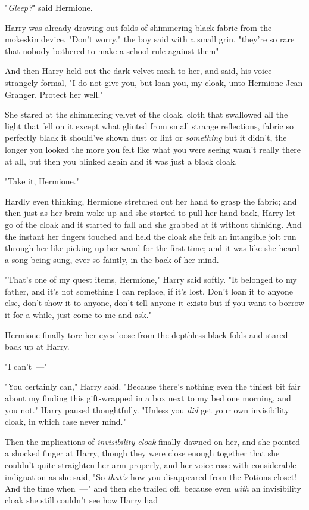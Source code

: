 "\emph{Gleep?}" said Hermione.

Harry was already drawing out folds of shimmering black fabric from the
mokeskin device. "Don't worry," the boy said with a small grin, "they're so
rare that nobody bothered to make a school rule against them{\el}"

And then Harry held out the dark velvet mesh to her, and said, his voice
strangely formal, "I do not give you, but loan you, my cloak, unto Hermione
Jean Granger. Protect her well."

She stared at the shimmering velvet of the cloak, cloth that swallowed all the
light that fell on it except what glinted from small strange reflections,
fabric so perfectly black it should've shown dust or lint or \emph{something}
but it didn't, the longer you looked the more you felt like what you were
seeing wasn't really there at all, but then you blinked again and it was just a
black cloak.

"Take it, Hermione."

Hardly even thinking, Hermione stretched out her hand to grasp the fabric; and
then just as her brain woke up and she started to pull her hand back, Harry let
go of the cloak and it started to fall and she grabbed at it without thinking.
And the instant her fingers touched and held the cloak she felt an intangible
jolt run through her like picking up her wand for the first time; and it was
like she heard a song being sung, ever so faintly, in the back of her mind.

"That's one of my quest items, Hermione," Harry said softly. "It belonged to my
father, and it's not something I can replace, if it's lost. Don't loan it to
anyone else, don't show it to anyone, don't tell anyone it exists{\el} but
if you want to borrow it for a while, just come to me and ask."

Hermione finally tore her eyes loose from the depthless black folds and stared
back up at Harry.

"I can't~---"

"You certainly can," Harry said. "Because there's nothing even the tiniest bit
fair about my finding this gift-wrapped in a box next to my bed one morning,
and you{\el} not." Harry paused thoughtfully. "Unless you \emph{did} get
your own invisibility cloak, in which case never mind."

Then the implications of \emph{invisibility cloak} finally dawned on her, and
she pointed a shocked finger at Harry, though they were close enough together
that she couldn't quite straighten her arm properly, and her voice rose with
considerable indignation as she said, "So \emph{that's} how you disappeared
from the Potions closet! And the time when~---" and then she trailed off,
because even \emph{with} an invisibility cloak she still couldn't see how Harry
had{\el}

